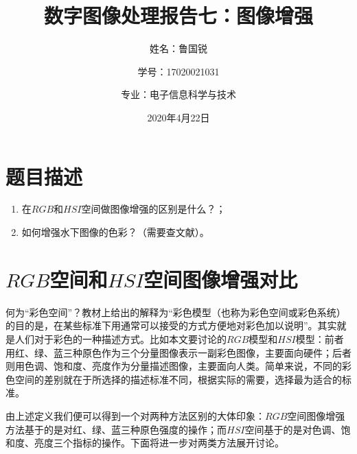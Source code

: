 \documentclass[UTF8]{ctexart}
\title{数字图像处理报告七：图像增强}
\author{姓名：鲁国锐 \protect\newline
\and 学号：17020021031 \\
\and 专业：电子信息科学与技术}
\date{2020年4月22日}
\begin{document}
	\maketitle
	\renewcommand{\contentsname}{目录}
	\renewcommand{\listfigurename}{插图目录}
	\renewcommand{\listtablename}{表格目录}
	\renewcommand{\refname}{参考文献}
	\renewcommand{\abstractname}{摘要}
	\renewcommand{\indexname}{索引}
	\renewcommand{\tablename}{表}
	\renewcommand{\figurename}{图}
	
	
	
	\tableofcontents
	\newpage
	
	\hypersetup{
	bookmarks=true,
	colorlinks=true,
	linkcolor=red,
	urlcolor=blue
	}
	\section{题目描述}
                \begin{enumerate}[leftmargin=50pt]
    				\item 在$RGB$和$HSI$空间做图像增强的区别是什么？；
    				\item 如何增强水下图像的色彩？（需要查文献）。
    			\end{enumerate}  

			
		


	
	\section{$RGB$空间和$HSI$空间图像增强对比}
        \indent 何为“彩色空间”？教材上给出的解释为\cite{digit_image_Gonzalez}“彩色模型（也称为彩色空间或彩色系统）的目的是，在某些标准下用通常可以接受的方式方便地对彩色加以说明”。其实就是人们对于彩色的一种描述方式。比如本文要讨论的$RGB$模型和$HSI$模型：前者用红、绿、蓝三种原色作为三个分量图像表示一副彩色图像，主要面向硬件；后者则用色调、饱和度、亮度作为分量描述图像，主要面向人类。简单来说，不同的彩色空间的差别就在于所选择的描述标准不同，根据实际的需要，选择最为适合的标准。
        
        \indent 由上述定义我们便可以得到一个对两种方法区别的大体印象：$RGB$空间图像增强方法基于的是对红、绿、蓝三种原色强度的操作；而$HSI$空间基于的是对色调、饱和度、亮度三个指标的操作。下面将进一步对两类方法展开讨论。
        
        
        
\end{document}
